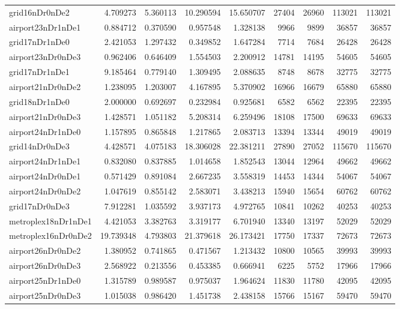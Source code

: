 \begin{longtable}{|l|r|r|r|r|r|r|r|r|}
grid16nDr0nDe2 & 4.709273 & 5.360113 & 10.290594 & 15.650707 & 27404 & 26960 & 113021 & 113021 \\
airport23nDr1nDe1 & 0.884712 & 0.370590 & 0.957548 & 1.328138 & 9966 & 9899 & 36857 & 36857 \\
grid17nDr1nDe0 & 2.421053 & 1.297432 & 0.349852 & 1.647284 & 7714 & 7684 & 26428 & 26428 \\
airport23nDr0nDe3 & 0.962406 & 0.646409 & 1.554503 & 2.200912 & 14781 & 14195 & 54605 & 54605 \\
grid17nDr1nDe1 & 9.185464 & 0.779140 & 1.309495 & 2.088635 & 8748 & 8678 & 32775 & 32775 \\
airport21nDr0nDe2 & 1.238095 & 1.203007 & 4.167895 & 5.370902 & 16966 & 16679 & 65880 & 65880 \\
grid18nDr1nDe0 & 2.000000 & 0.692697 & 0.232984 & 0.925681 & 6582 & 6562 & 22395 & 22395 \\
airport21nDr0nDe3 & 1.428571 & 1.051182 & 5.208314 & 6.259496 & 18108 & 17500 & 69633 & 69633 \\
airport24nDr1nDe0 & 1.157895 & 0.865848 & 1.217865 & 2.083713 & 13394 & 13344 & 49019 & 49019 \\
grid14nDr0nDe3 & 4.428571 & 4.075183 & 18.306028 & 22.381211 & 27890 & 27052 & 115670 & 115670 \\
airport24nDr1nDe1 & 0.832080 & 0.837885 & 1.014658 & 1.852543 & 13044 & 12964 & 49662 & 49662 \\
airport24nDr0nDe1 & 0.571429 & 0.891084 & 2.667235 & 3.558319 & 14453 & 14344 & 54067 & 54067 \\
airport24nDr0nDe2 & 1.047619 & 0.855142 & 2.583071 & 3.438213 & 15940 & 15654 & 60762 & 60762 \\
grid17nDr0nDe3 & 7.912281 & 1.035592 & 3.937173 & 4.972765 & 10841 & 10262 & 40253 & 40253 \\
metroplex18nDr1nDe1 & 4.421053 & 3.382763 & 3.319177 & 6.701940 & 13340 & 13197 & 52029 & 52029 \\
metroplex16nDr0nDe2 & 19.739348 & 4.793803 & 21.379618 & 26.173421 & 17750 & 17337 & 72673 & 72673 \\
airport26nDr0nDe2 & 1.380952 & 0.741865 & 0.471567 & 1.213432 & 10800 & 10565 & 39993 & 39993 \\
airport26nDr0nDe3 & 2.568922 & 0.213556 & 0.453385 & 0.666941 & 6225 & 5752 & 17966 & 17966 \\
airport25nDr1nDe0 & 1.315789 & 0.989587 & 0.975037 & 1.964624 & 11830 & 11780 & 42095 & 42095 \\
airport25nDr0nDe3 & 1.015038 & 0.986420 & 1.451738 & 2.438158 & 15766 & 15167 & 59470 & 59470 \\

\end{longtable}
